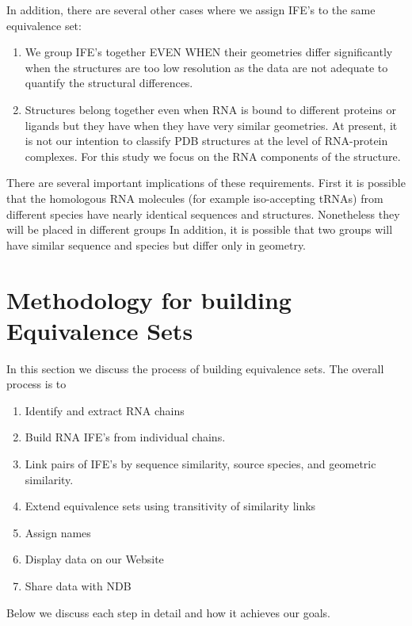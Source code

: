 In addition, there are several other cases where we assign IFE’s to the same
equivalence set:

\begin{enumerate}
  \item We group IFE’s together EVEN WHEN their geometries differ significantly
    when the structures are too low resolution as the data are not adequate to
    quantify the structural differences.

  \item Structures belong together even when RNA is bound to different proteins
    or ligands but they have when they have very similar geometries. At present,
    it is not our intention to classify PDB structures at the level of
    RNA-protein complexes. For this study we focus on the RNA components of the
    structure.
\end{enumerate}

There are several important implications of these requirements. First it is
possible that the homologous RNA molecules (for example iso-accepting tRNAs)
from different species have nearly identical sequences and structures.
Nonetheless they will be placed in different groups In addition, it is possible
that two groups will have similar sequence and species but differ only in
geometry.

\section{Methodology for building Equivalence Sets}

In this section we discuss the process of building equivalence sets. The overall
process is to
\begin{enumerate}
  \item Identify and extract RNA chains

  \item Build RNA IFE's from individual chains.

  \item Link pairs of IFE's by sequence similarity, source species, and
    geometric similarity.

  \item Extend equivalence sets using transitivity of similarity links

  \item Assign names

  \item Display data on our Website

  \item Share data with NDB
\end{enumerate}
Below we discuss each step in detail and how it achieves our goals.


